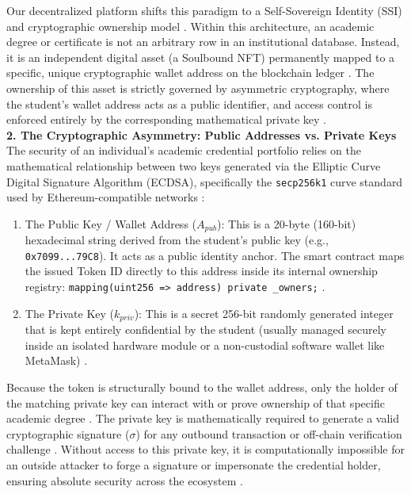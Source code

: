 Our decentralized platform shifts this paradigm to a Self-Sovereign Identity (SSI) and cryptographic ownership model \cite{kumutha2021blockchainacdaemic}. Within this architecture, an academic degree or certificate is not an arbitrary row in an institutional database. Instead, it is an independent digital asset (a Soulbound NFT) permanently mapped to a specific, unique cryptographic wallet address on the blockchain ledger \cite{fairfield2022tokenized}. The ownership of this asset is strictly governed by asymmetric cryptography, where the student's wallet address acts as a public identifier, and access control is enforced entirely by the corresponding mathematical private key \cite{muhamed2018eductx}.\\

\textbf{2. The Cryptographic Asymmetry: Public Addresses vs. Private Keys}\\

The security of an individual's academic credential portfolio relies on the mathematical relationship between two keys generated via the Elliptic Curve Digital Signature Algorithm (ECDSA), specifically the \texttt{secp256k1} curve standard used by Ethereum-compatible networks \cite{nfterc721web}:

\begin{enumerate}
    \item The Public Key / Wallet Address ($A_{pub}$): This is a 20-byte (160-bit) hexadecimal string derived from the student's public key (e.g., \texttt{0x7099...79C8}). It acts as a public identity anchor. The smart contract maps the issued Token ID directly to this address inside its internal ownership registry: \texttt{mapping(uint256 => address) private \_owners;} \cite{onlinev0835web}.
    \item The Private Key ($k_{priv}$): This is a secret 256-bit randomly generated integer that is kept entirely confidential by the student (usually managed securely inside an isolated hardware module or a non-custodial software wallet like MetaMask) \cite{blockchainineducation}.
\end{enumerate}

Because the token is structurally bound to the wallet address, only the holder of the matching private key can interact with or prove ownership of that specific academic degree \cite{perez2020smartcontracts}. The private key is mathematically required to generate a valid cryptographic signature ($\sigma$) for any outbound transaction or off-chain verification challenge \cite{openzeppelin2026erc721}. Without access to this private key, it is computationally impossible for an outside attacker to forge a signature or impersonate the credential holder, ensuring absolute security across the ecosystem \cite{muhamed2018eductx}.\\

